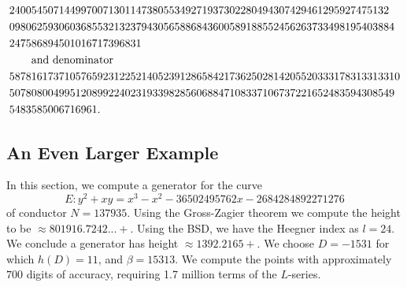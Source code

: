 \begin{small}
\begin{align*}
&240054507144997007130114738055349271937302280494307429461295927475132\\ &0980625930603685532132379430565886843600589188552456263733498195403884\\ 
&247586894501016717396831\\
&\;\;\;\;\;\;\text{\begin{normalsize} and denominator\end{normalsize}} \\
&58781617371057659231225214052391286584217362502814205520333178313313310\\ &5078080049951208992240231933982856068847108337106737221652483594308549\\ 
&5483585006716961.
\end{align*}
\end{small}


\subsection{An Even Larger Example}
In this section, we compute a generator for the curve 
$$E:y^2 + xy = x^3 - x^2 - 36502495762x - 2684284892271276$$
of conductor $N = 137935$. Using the Gross-Zagier theorem we compute the height to be $\approx 801916.7242...+$. Using the BSD, we have the Heegner index as $l = 24$. We conclude a generator has height $\approx 1392.2165+$. We choose $D = -1531$ for which $h(D) = 11$, and $\beta = 15313.$ We compute the points with approximately $700$ digits of accuracy, requiring 1.7 million terms of the $L$-series.

